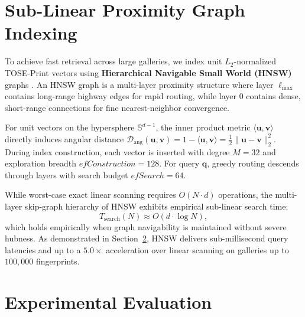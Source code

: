 \documentclass[lettersize,journal]{IEEEtran}
\begin{document}
\section{Sub-Linear Proximity Graph Indexing}
\label{sec:indexing}

To achieve fast retrieval across large galleries, we index unit $L_2$-normalized TOSE-Print vectors using \textbf{Hierarchical Navigable Small World (HNSW)} graphs \cite{b44}. An HNSW graph is a multi-layer proximity structure where layer $\ell_{\text{max}}$ contains long-range highway edges for rapid routing, while layer $0$ contains dense, short-range connections for fine nearest-neighbor convergence.

For unit vectors on the hypersphere $\mathbb{S}^{d-1}$, the inner product metric $\langle \mathbf{u}, \mathbf{v} \rangle$ directly induces angular distance $\mathcal{D}_{\text{ang}}(\mathbf{u}, \mathbf{v}) = 1 - \langle \mathbf{u}, \mathbf{v} \rangle = \frac{1}{2} \|\mathbf{u} - \mathbf{v}\|_2^2$. During index construction, each vector is inserted with degree $M = 32$ and exploration breadth $efConstruction = 128$. For query $\mathbf{q}$, greedy routing descends through layers with search budget $efSearch = 64$. 

While worst-case exact linear scanning requires $O(N \cdot d)$ operations, the multi-layer skip-graph hierarchy of HNSW exhibits empirical sub-linear search time:
\begin{equation}
    T_{\text{search}}(N) \approx O(d \cdot \log N),
    \label{eq:hnsw_complexity}
\end{equation}
which holds empirically when graph navigability is maintained without severe hubness. As demonstrated in Section~\ref{sec:experiments}, HNSW delivers sub-millisecond query latencies and up to a $5.0\times$ acceleration over linear scanning on galleries up to $100,000$ fingerprints.

\section{Experimental Evaluation}
\label{sec:experiments}
\end{document}

